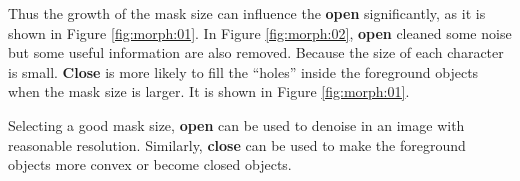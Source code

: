 \documentclass[paper=a4, fontsize=11pt]{scrartcl}
\numberwithin{equation}{section}		%
\numberwithin{figure}{section}			%
\numberwithin{table}{section}				%
\begin{document}
Thus the growth of the mask size can influence the \textbf{open} significantly, as it is shown in Figure \ref{fig:morph:01}.
In Figure \ref{fig:morph:02}, \textbf{open} cleaned some noise but some useful information are also removed.
Because the size of each character is small.
\textbf{Close} is more likely to fill the ``holes'' inside the foreground objects when the mask size is larger.
It is shown in Figure \ref{fig:morph:01}.

Selecting a good mask size, \textbf{open} can be used to denoise in an image with reasonable resolution.
Similarly, \textbf{close} can be used to make the foreground objects more convex or become closed objects.
\end{document}
